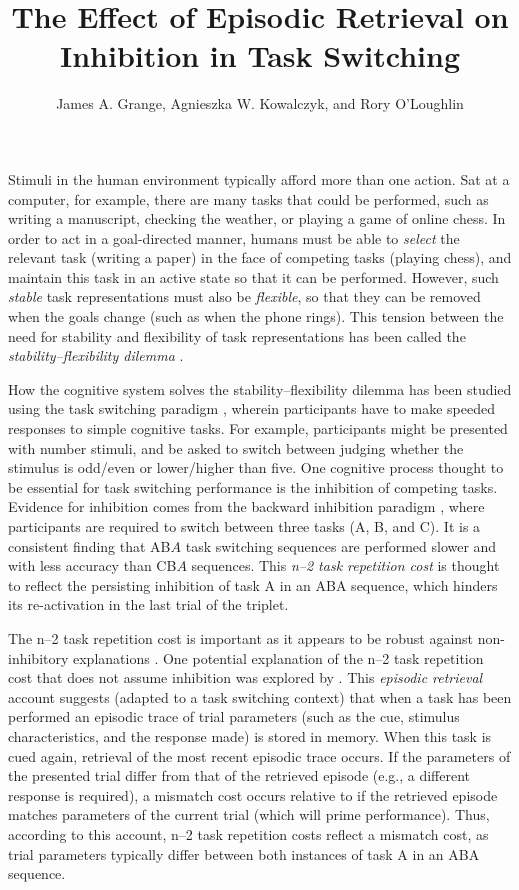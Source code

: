 \documentclass[a4paper, man, natbib]{apa6}
\title{The Effect of Episodic Retrieval on Inhibition in Task Switching}
\author{James A. Grange, Agnieszka W. Kowalczyk, and Rory O'Loughlin}
\affiliation{School of Psychology, Keele University, UK}
\begin{document}
\maketitle

Stimuli in the human environment typically afford more than one action. Sat at a computer, for example, there are many tasks that could be performed, such as writing a manuscript, checking the weather, or playing a game of online chess. In order to act in a goal-directed manner, humans must be able to \emph{select} the relevant task (writing a paper) in the face of competing tasks (playing chess), and maintain this task in an active state so that it can be performed. However, such \emph{stable} task representations must also be \emph{flexible}, so that they can be removed when the goals change (such as when the phone rings). This tension between the need for stability and flexibility of task representations has been called the \emph{stability--flexibility dilemma} \citep{Goschke2000}. 

How the cognitive system solves the stability--flexibility dilemma has been studied using the task switching paradigm \citep{Grange2014a,Kiesel2010,Vandierendonck2010}, wherein participants have to make speeded responses to simple cognitive tasks. For example, participants might be presented with number stimuli, and be asked to switch between judging whether the stimulus is odd/even or lower/higher than five. One cognitive process thought to be essential for task switching performance is the inhibition of competing tasks. Evidence for inhibition comes from the backward inhibition paradigm \citep{Koch2010, Mayr2000}, where participants are required to switch between three tasks (A, B, and C).  It is a consistent finding that AB$A$ task switching sequences are performed slower and with less accuracy than CB$A$ sequences. This \emph{n--2 task repetition cost} is thought to reflect the persisting inhibition of task A in an ABA sequence, which hinders its re-activation in the last trial of the triplet.

The n--2 task repetition cost is important as it appears to be robust against non-inhibitory explanations \citep{Mayr2007}. One potential explanation of the n--2 task repetition cost that does not assume inhibition was explored by \cite{Mayr2002}. This \emph{episodic retrieval} account \citep{Neill1997} suggests (adapted to a task switching context) that when a task has been performed an episodic trace of trial parameters (such as the cue, stimulus characteristics, and the response made) is stored in memory. When this task is cued again, retrieval of the most recent episodic trace occurs. If the parameters of the presented trial differ from that of the retrieved episode (e.g., a different response is required), a mismatch cost occurs relative to if the retrieved episode matches parameters of the current trial (which will prime performance). Thus, according to this account, n--2 task repetition costs reflect a mismatch cost, as trial parameters typically differ between both instances of task A in an ABA sequence.
\end{document}
